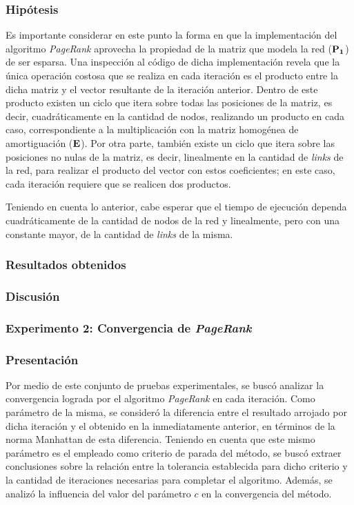             \subsubsection*{Hipótesis}
            Es importante considerar en este punto la forma en que la implementación del algoritmo \emph{PageRank} aprovecha la propiedad de la matriz que modela la red ($\mathbf{P_1}$) de ser esparsa. Una inspección al código de dicha implementación revela que la única operación costosa que se realiza en cada iteración es  el producto entre la dicha matriz y el vector resultante de la iteración anterior. Dentro de este producto existen un ciclo que itera sobre todas las posiciones de la matriz, es decir, cuadráticamente en la cantidad de nodos, realizando un producto en cada caso, correspondiente a la multiplicación con la matriz homogénea de amortiguación ($\mathbf{E}$). Por otra parte, también existe un ciclo que itera sobre las posiciones no nulas de la matriz, es decir, linealmente en la cantidad de \emph{links} de la red, para realizar el producto del vector con estos coeficientes; en este caso, cada iteración requiere que se realicen dos productos.

            Teniendo en cuenta lo anterior, cabe esperar que el tiempo de ejecución dependa cuadráticamente de la cantidad de nodos de la red y linealmente, pero con una constante mayor, de la cantidad de \emph{links} de la misma.

            \subsubsection*{Resultados obtenidos}

            \subsubsection*{Discusión}

        \subsubsection{Experimento 2: Convergencia de \emph{PageRank}}

            \subsubsection*{Presentación}
            Por medio de este conjunto de pruebas experimentales, se buscó analizar la convergencia lograda por el algoritmo \emph{PageRank} en cada iteración. Como parámetro de la misma, se consideró la diferencia entre el resultado arrojado por dicha iteración y el obtenido en la inmediatamente anterior, en términos de la norma Manhattan de esta diferencia. Teniendo en cuenta que este mismo parámetro es el empleado como criterio de parada del método, se buscó extraer conclusiones sobre la relación entre la tolerancia establecida para dicho criterio y la cantidad de iteraciones necesarias para completar el algoritmo. Además, se analizó la influencia del valor del parámetro $c$ en la convergencia del método.

